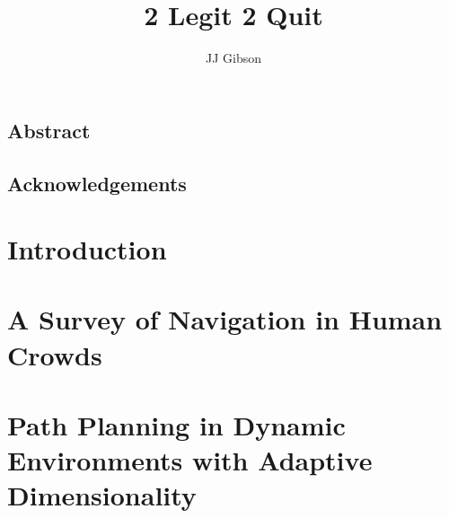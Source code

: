 \documentclass[twoside,10pt]{report}
\newcommand{\clearemptydoublepage}{\newpage{\pagestyle{empty}\cleardoublepage}}
\newcommand*\NewPage{\newpage\null\thispagestyle{empty}\newpage}
\begin{document}


\title{2 Legit 2 Quit}
\author{JJ Gibson}



\clearpage


\clearemptydoublepage
\NewPage
\setcounter{page}{1}

\begin{centering} \section*{Abstract} \end{centering}


\NewPage

\begin{centering} \section*{Acknowledgements} \end{centering}


\NewPage


\tableofcontents
\clearpage


\setcounter{page}{1}


\chapter{Introduction}
\label{chap:introduction}


\clearpage

\chapter{A Survey of Navigation in Human Crowds}
\label{chap:survey}


\clearpage

\chapter{Path Planning in Dynamic Environments with Adaptive Dimensionality}
\label{chap:ppad}


\clearpage
\end{document}
